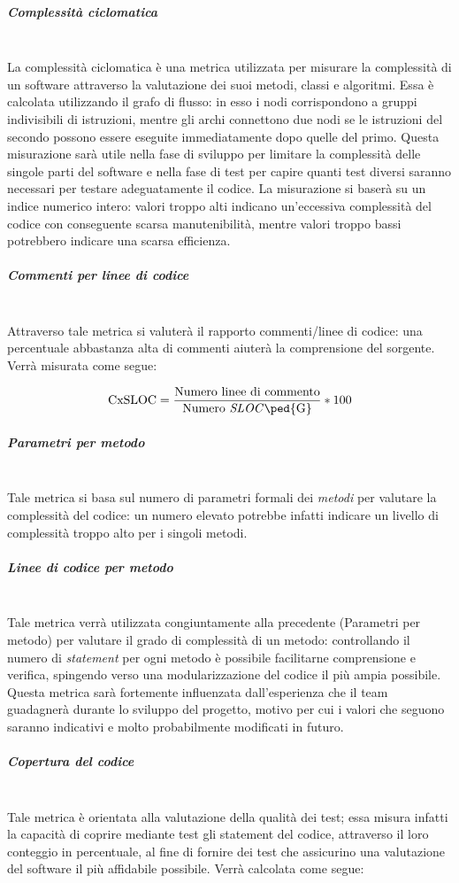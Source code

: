 \subparagraph{Complessità ciclomatica}
~\\La complessità ciclomatica è una metrica utilizzata per misurare la complessità di un software attraverso la valutazione dei suoi metodi, classi e algoritmi. Essa è calcolata utilizzando il grafo di flusso: in esso i nodi corrispondono a gruppi indivisibili di istruzioni, mentre gli archi connettono due nodi se le istruzioni del secondo possono essere eseguite immediatamente dopo quelle del primo.
Questa misurazione sarà utile nella fase di sviluppo per limitare la complessità delle singole parti del software e nella fase di test per capire quanti test diversi saranno necessari per testare adeguatamente il codice.
La misurazione si baserà su un indice numerico intero: valori troppo alti indicano un'eccessiva complessità del codice con conseguente scarsa manutenibilità, mentre valori troppo bassi potrebbero indicare una scarsa efficienza.

\subparagraph{Commenti per linee di codice}
~\\Attraverso tale metrica si valuterà il rapporto commenti/linee di codice: una percentuale abbastanza alta di commenti aiuterà la comprensione del sorgente. Verrà misurata come segue:

\begin{displaymath}
	\mbox{CxSLOC} =\frac{\mbox{Numero linee di commento}}{\mbox{Numero \emph{SLOC}\ped{G}}} * 100
\end{displaymath}

\subparagraph{Parametri per metodo}
~\\Tale metrica si basa sul numero di parametri formali dei \emph{metodi} per valutare la complessità del codice: un numero elevato potrebbe infatti indicare un livello di complessità troppo alto per i singoli metodi.

\subparagraph{Linee di codice per metodo}
~\\Tale metrica verrà utilizzata congiuntamente alla precedente (Parametri per metodo) per valutare il grado di complessità di un metodo: controllando il numero di \emph{statement} per ogni metodo è possibile facilitarne comprensione e verifica, spingendo verso una modularizzazione del codice il più ampia possibile. 
Questa metrica sarà fortemente influenzata dall'esperienza che il team guadagnerà durante lo sviluppo del progetto, motivo per cui i valori che seguono saranno indicativi e molto probabilmente modificati in futuro.

\subparagraph{Copertura del codice}
~\\Tale metrica è orientata alla valutazione della qualità dei test; essa misura infatti la capacità di coprire mediante test gli statement del codice, attraverso il loro conteggio in percentuale, al fine di fornire dei test che assicurino una valutazione del software il più affidabile possibile. Verrà calcolata come segue:

